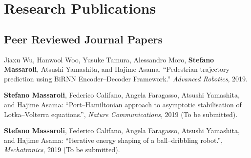\chapter*{Research Publications}

\thispagestyle{empty}

\newpage
\section*{Peer Reviewed Journal Papers}
\begin{enumerate}[{[}j1{]}]
	\item Jiaxu Wu, Hanwool Woo, Yusuke Tamura, Alessandro Moro, \textbf{Stefano Massaroli},
	Atsushi Yamashita, and Hajime Asama. ``Pedestrian trajectory prediction using BiRNN
	Encoder--Decoder Framework.'' \textit{Advanced Robotics}, 2019.
	\item \textbf{Stefano Massaroli}, Federico Califano, Angela Faragasso, Atsushi Yamashita, and Hajime Asama: ``Port--Hamiltonian approach to asymptotic stabilisation of Lotka--Volterra equations.'', \textit{Nature Communications}, 2019 (To be submitted).
	\item \textbf{Stefano Massaroli}, Federico Califano, Angela Faragasso, Atsushi Yamashita, and Hajime Asama: ``Iterative energy shaping of a ball--dribbling robot.'', \textit{Mechatronics}, 2019 (To be submitted).
\end{enumerate}

